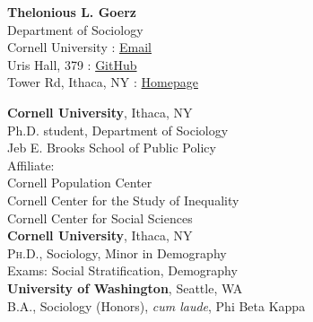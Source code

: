 \documentclass[10pt]{article} %
\begin{document}
{\Large \textbf{Thelonious L. Goerz}} \\


Department of Sociology \\
Cornell University \hfill {} : \href{mailto:theloniouslgoerz@gmail.com}{Email}\\ %
Uris Hall, 379  \hfill {} : \href{https://github.com/theloniousgoerz/}{GitHub}\\ %
Tower Rd, Ithaca, NY \hfill {} : \href{theloniousgoerz.github.io}{Homepage} \\

\vspace{0.001\textheight} %




 \textbf{Cornell University}, Ithaca, NY \\
Ph.D. student, Department of Sociology \\ 
Jeb E. Brooks School of Public Policy  \\
Affiliate: \\
\hspace*{10mm} Cornell Population Center 
\\ \hspace*{10mm} Cornell Center for the Study of Inequality \\
\hspace*{10mm} Cornell Center for Social Sciences \\

  \textbf{Cornell University}, Ithaca, NY \\
 \textsc{Ph.D.}, Sociology, Minor in Demography \\
\hspace*{10mm} Exams: Social Stratification, Demography\\
 
 \textbf{University of Washington}, Seattle, WA\\
\textsc{B.A.}, Sociology (Honors), \emph{cum laude}, Phi Beta Kappa \\
\end{document}
